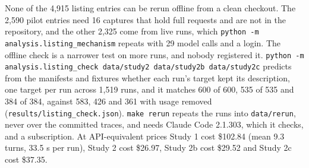 \documentclass[10pt]{article}
\newcommand{\code}[1]{\texttt{#1}}
\begin{document}
None of the 4,915 listing entries can be rerun offline from a clean checkout. The 2,590 pilot entries need 16 captures that hold full requests and are not in the repository, and the other 2,325 come from live runs, which \code{python -m analysis.listing\_mechanism} repeats with 29 model calls and a login. The offline check is a narrower test on more runs, and nobody registered it. \code{python -m analysis.listing\_check data/study2 data/study2b data/study2c} predicts from the manifests and fixtures whether each run's target kept its description, one target per run across 1,519 runs, and it matches 600 of 600, 535 of 535 and 384 of 384, against 583, 426 and 361 with usage removed (\code{results/listing\_check.json}). \code{make rerun} repeats the runs into \code{data/rerun}, never over the committed traces, and needs Claude Code 2.1.303, which it checks, and a subscription. At API-equivalent prices Study 1 cost \$102.84 (mean 9.3 turns, 33.5 s per run), Study 2 cost \$26.97, Study 2b cost \$29.52 and Study 2c cost \$37.35.



\end{document}
